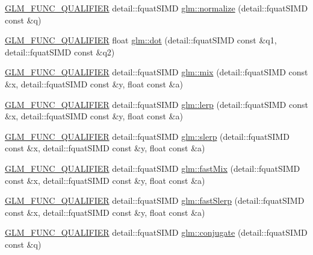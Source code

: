 \begin{DoxyCompactItemize}
\item 
\hyperlink{setup_8hpp_a33fdea6f91c5f834105f7415e2a64407}{G\+L\+M\+\_\+\+F\+U\+N\+C\+\_\+\+Q\+U\+A\+L\+I\+F\+I\+ER} detail\+::fquat\+S\+I\+MD \hyperlink{namespaceglm_a31e71acc931a3619a3305958048cfa8d}{glm\+::normalize} (detail\+::fquat\+S\+I\+MD const \&q)
\item 
\hyperlink{setup_8hpp_a33fdea6f91c5f834105f7415e2a64407}{G\+L\+M\+\_\+\+F\+U\+N\+C\+\_\+\+Q\+U\+A\+L\+I\+F\+I\+ER} float \hyperlink{namespaceglm_ab68375a7ad5f9dc3db97323af1326bbb}{glm\+::dot} (detail\+::fquat\+S\+I\+MD const \&q1, detail\+::fquat\+S\+I\+MD const \&q2)
\item 
\hyperlink{setup_8hpp_a33fdea6f91c5f834105f7415e2a64407}{G\+L\+M\+\_\+\+F\+U\+N\+C\+\_\+\+Q\+U\+A\+L\+I\+F\+I\+ER} detail\+::fquat\+S\+I\+MD \hyperlink{namespaceglm_a1539ad90a9eb88f535d9dfacba04c1c9}{glm\+::mix} (detail\+::fquat\+S\+I\+MD const \&x, detail\+::fquat\+S\+I\+MD const \&y, float const \&a)
\item 
\hyperlink{setup_8hpp_a33fdea6f91c5f834105f7415e2a64407}{G\+L\+M\+\_\+\+F\+U\+N\+C\+\_\+\+Q\+U\+A\+L\+I\+F\+I\+ER} detail\+::fquat\+S\+I\+MD \hyperlink{namespaceglm_a4d8cd3fe0165431fb1c54cbeb432bf26}{glm\+::lerp} (detail\+::fquat\+S\+I\+MD const \&x, detail\+::fquat\+S\+I\+MD const \&y, float const \&a)
\item 
\hyperlink{setup_8hpp_a33fdea6f91c5f834105f7415e2a64407}{G\+L\+M\+\_\+\+F\+U\+N\+C\+\_\+\+Q\+U\+A\+L\+I\+F\+I\+ER} detail\+::fquat\+S\+I\+MD \hyperlink{namespaceglm_a40d5134f42aaa1511518d2abe97e0ebc}{glm\+::slerp} (detail\+::fquat\+S\+I\+MD const \&x, detail\+::fquat\+S\+I\+MD const \&y, float const \&a)
\item 
\hyperlink{setup_8hpp_a33fdea6f91c5f834105f7415e2a64407}{G\+L\+M\+\_\+\+F\+U\+N\+C\+\_\+\+Q\+U\+A\+L\+I\+F\+I\+ER} detail\+::fquat\+S\+I\+MD \hyperlink{namespaceglm_acf0fe775efd8a75dc6dc603efd157231}{glm\+::fast\+Mix} (detail\+::fquat\+S\+I\+MD const \&x, detail\+::fquat\+S\+I\+MD const \&y, float const \&a)
\item 
\hyperlink{setup_8hpp_a33fdea6f91c5f834105f7415e2a64407}{G\+L\+M\+\_\+\+F\+U\+N\+C\+\_\+\+Q\+U\+A\+L\+I\+F\+I\+ER} detail\+::fquat\+S\+I\+MD \hyperlink{namespaceglm_a57c9ec50932abd564671a28cd7ba53e0}{glm\+::fast\+Slerp} (detail\+::fquat\+S\+I\+MD const \&x, detail\+::fquat\+S\+I\+MD const \&y, float const \&a)
\item 
\hyperlink{setup_8hpp_a33fdea6f91c5f834105f7415e2a64407}{G\+L\+M\+\_\+\+F\+U\+N\+C\+\_\+\+Q\+U\+A\+L\+I\+F\+I\+ER} detail\+::fquat\+S\+I\+MD \hyperlink{namespaceglm_a079af2a66c2439c64053382e8c98f213}{glm\+::conjugate} (detail\+::fquat\+S\+I\+MD const \&q)

\end{DoxyCompactItemize}
